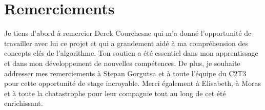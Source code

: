 \section*{Remerciements}
Je tiens d'abord à remercier Derek Courchesne qui m'a donné l'opportunité de travailler avec lui ce projet et qui a grandement aidé à ma compréhension des concepts clés de l'algorithme. Ton soutien a été essentiel dans mon apprentissage et dans mon développement de nouvelles compétences. De plus, je souhaite addresser mes remerciements à Stepan Gorgutsa et à toute l'équipe du C2T3 pour cette opportunité de stage incroyable. Merci également à Elisabeth, à Moras et à toute la chatastrophe pour leur compagnie tout au long de cet été enrichissant.
